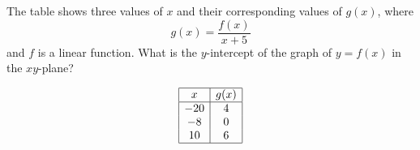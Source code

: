 \vspace{0.75em}


\vspace{2em}
\newpage

\noindent\markforreview
\vspace{1em}

The table shows three values of \(x\) and their corresponding values of \(g(x)\), where
\[
g(x) = \frac{f(x)}{x + 5}
\]
and \(f\) is a linear function.
What is the \(y\)-intercept of the graph of \(y = f(x)\) in the \(xy\)-plane?

\[
\begin{array}{|c|c|}
\hline
x & g(x) \\
\hline
-20 & 4 \\
-8 & 0 \\
10 & 6 \\
\hline
\end{array}
\]

\vspace{0.75em}


\vspace{2em}
